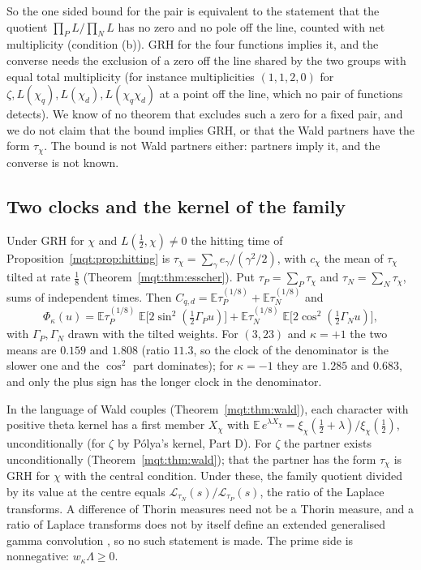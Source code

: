 So the one sided bound for the pair is equivalent to the statement that the quotient $\prod_PL/\prod_NL$ has no zero and no pole off the line, counted with net multiplicity (condition (b)). GRH for the four functions implies it, and the converse needs the exclusion of a zero off the line shared by the two groups with equal total multiplicity (for instance multiplicities $(1,1,2,0)$ for $\zeta,L(\chi_q),L(\chi_d),L(\chi_q\chi_d)$ at a point off the line, which no pair of functions detects). We know of no theorem that excludes such a zero for a fixed pair, and we do not claim that the bound implies GRH, or that the Wald partners have the form $\tau_\chi$. The bound is not Wald partners either: partners imply it, and the converse is not known.

\subsection{Two clocks and the kernel of the family}\label{mqf:sub:clocks}

Under GRH for $\chi$ and $L(\frac12,\chi)\ne0$ the hitting time of Proposition~\ref{mqt:prop:hitting} is $\tau_\chi=\sum_\gamma e_\gamma/(\gamma^2/2)$, with $c_\chi$ the mean of $\tau_\chi$ tilted at rate $\frac18$ (Theorem~\ref{mqt:thm:esscher}). Put $\tau_P=\sum_P\tau_\chi$ and $\tau_N=\sum_N\tau_\chi$, sums of independent times. Then $C_{q,d}=\mathbb E\tau_P^{(1/8)}+\mathbb E\tau_N^{(1/8)}$ and
\[
\Phi_\kappa(u)=\mathbb E\tau_P^{(1/8)}\;\mathbb E\bigl[2\sin^2(\tfrac12\Gamma_Pu)\bigr]+\mathbb E\tau_N^{(1/8)}\;\mathbb E\bigl[2\cos^2(\tfrac12\Gamma_Nu)\bigr],
\]
with $\Gamma_P,\Gamma_N$ drawn with the tilted weights. For $(3,23)$ and $\kappa=+1$ the two means are $0.159$ and $1.808$ (ratio $11.3$, so the clock of the denominator is the slower one and the $\cos^2$ part dominates); for $\kappa=-1$ they are $1.285$ and $0.683$, and only the plus sign has the longer clock in the denominator.

In the language of Wald couples (Theorem~\ref{mqt:thm:wald}), each character with positive theta kernel has a first member $X_\chi$ with $\mathbb E\,e^{\lambda X_\chi}=\xi_\chi(\frac12+\lambda)/\xi_\chi(\frac12)$, unconditionally (for $\zeta$ by Pólya's kernel, Part D). For $\zeta$ the partner exists unconditionally (Theorem~\ref{mqt:thm:wald}); that the partner has the form $\tau_\chi$ is GRH for $\chi$ with the central condition. Under these, the family quotient divided by its value at the centre equals $\mathcal L_{\tau_N}(s)/\mathcal L_{\tau_P}(s)$, the ratio of the Laplace transforms. A difference of Thorin measures need not be a Thorin measure, and a ratio of Laplace transforms does not by itself define an extended generalised gamma convolution \cite{Bondesson}, so no such statement is made. The prime side is nonnegative: $w_\kappa\Lambda\ge0$.

